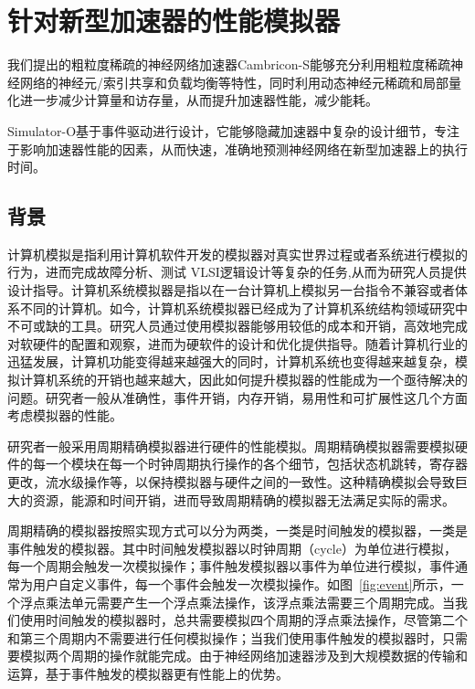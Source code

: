 \chapter{针对新型加速器的性能模拟器}

我们提出的粗粒度稀疏的神经网络加速器Cambricon-S能够充分利用粗粒度稀疏神经网络的神经元/索引共享和负载均衡等特性，同时利用动态神经元稀疏和局部量化进一步减少计算量和访存量，从而提升加速器性能，减少能耗。


Simulator-O基于事件驱动进行设计，它能够隐藏加速器中复杂的设计细节，专注于影响加速器性能的因素，从而快速，准确地预测神经网络在新型加速器上的执行时间。


\section{背景}
计算机模拟是指利用计算机软件开发的模拟器对真实世界过程或者系统进行模拟的行为，进而完成故障分析、测试 VLSI逻辑设计等复杂的任务,从而为研究人员提供设计指导。计算机系统模拟器是指以在一台计算机上模拟另一台指令不兼容或者体系不同的计算机。如今，计算机系统模拟器已经成为了计算机系统结构领域研究中不可或缺的工具。研究人员通过使用模拟器能够用较低的成本和开销，高效地完成对软硬件的配置和观察，进而为硬软件的设计和优化提供指导。随着计算机行业的迅猛发展，计算机功能变得越来越强大的同时，计算机系统也变得越来越复杂，模拟计算机系统的开销也越来越大，因此如何提升模拟器的性能成为一个亟待解决的问题。研究者一般从准确性，事件开销，内存开销，易用性和可扩展性这几个方面考虑模拟器的性能。

研究者一般采用周期精确模拟器进行硬件的性能模拟。周期精确模拟器需要模拟硬件的每一个模块在每一个时钟周期执行操作的各个细节，包括状态机跳转，寄存器更改，流水级操作等，以保持模拟器与硬件之间的一致性。这种精确模拟会导致巨大的资源，能源和时间开销，进而导致周期精确的模拟器无法满足实际的需求。

周期精确的模拟器按照实现方式可以分为两类，一类是时间触发的模拟器，一类是事件触发的模拟器。其中时间触发模拟器以时钟周期（cycle）为单位进行模拟，每一个周期会触发一次模拟操作；事件触发模拟器以事件为单位进行模拟，事件通常为用户自定义事件，每一个事件会触发一次模拟操作。如图~\ref{fig:event}所示，一个浮点乘法单元需要产生一个浮点乘法操作，该浮点乘法需要三个周期完成。当我们使用时间触发的模拟器时，总共需要模拟四个周期的浮点乘法操作，尽管第二个和第三个周期内不需要进行任何模拟操作；当我们使用事件触发的模拟器时，只需要模拟两个周期的操作就能完成。由于神经网络加速器涉及到大规模数据的传输和运算，基于事件触发的模拟器更有性能上的优势。

